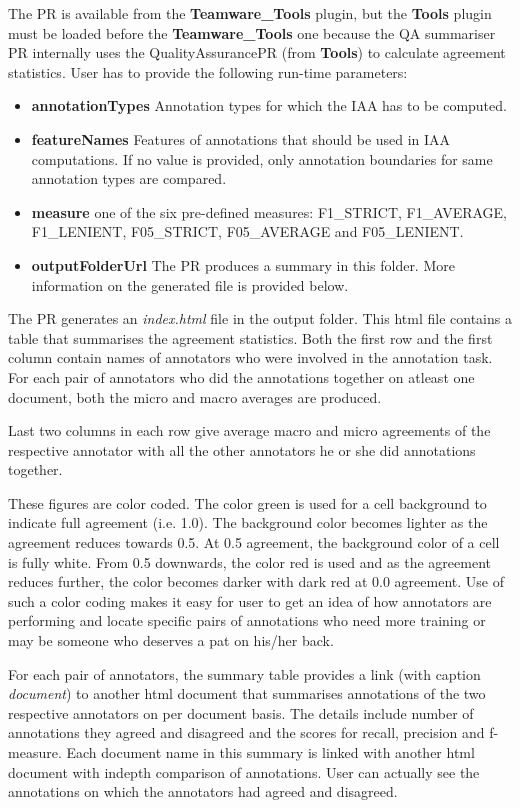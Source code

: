 The PR is available from the \textbf{Teamware\_Tools} plugin, but the
\textbf{Tools} plugin must be loaded before the \textbf{Teamware\_Tools} one
because the QA summariser PR internally uses the QualityAssurancePR (from
\textbf{Tools}) to calculate agreement statistics.  User has to provide the
following run-time parameters:

\begin{itemize}
\item \textbf{annotationTypes}  Annotation types for which the IAA has to be 
  computed.
\item \textbf{featureNames}  Features of annotations that should be used in IAA 
  computations. If no value is provided, only annotation boundaries for same
  annotation types are compared.
\item \textbf{measure}
  one of the six pre-defined measures: F1\_STRICT, F1\_AVERAGE,
F1\_LENIENT, F05\_STRICT, F05\_AVERAGE and F05\_LENIENT.
\item \textbf{outputFolderUrl}
  The PR produces a summary in this folder.  More information on the generated
  file is provided below.
\end{itemize}

The PR generates an \textit{index.html} file in the output folder. This html 
file contains a table that summarises the agreement statistics.  Both the first 
row and the first column contain names of annotators who were involved in the 
annotation task.  For each pair of annotators who did the annotations together 
on atleast one document, both the micro and macro averages are produced. 

Last two columns in each row give average macro and micro agreements of the
respective annotator with all the other annotators he or she did annotations 
together.

These figures are color coded. The color green is used for a cell background to 
indicate full agreement (i.e. 1.0). The background color becomes lighter as the 
agreement reduces towards 0.5.  At 0.5 agreement, the background color of a cell
is fully white. From 0.5 downwards, the color red is used and as the agreement 
reduces further, the color becomes darker with dark red at 0.0 agreement.  Use 
of such a color coding makes it easy for user to get an idea of how annotators 
are performing and locate specific pairs of annotations who need more training 
or may be someone who deserves a pat on his/her back.

For each pair of annotators, the summary table provides a link (with caption 
\textit{document}) to another html document that summarises annotations of the
two respective annotators on per document basis.  The details include number of
annotations they agreed and disagreed and the scores for recall, precision and 
f-measure.  Each document name in this summary is linked with another html 
document with indepth comparison of annotations.  User can actually see the 
annotations on which the annotators had agreed and disagreed.


%
%

%


